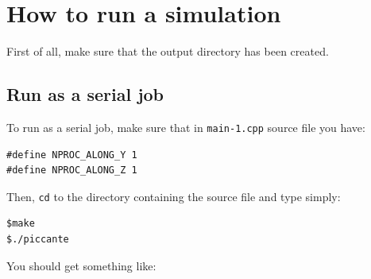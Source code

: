 \documentclass[11pt,a4paper]{report}
\begin{document}
\chapter{How to run a simulation}\label{chapter_run}
First of all, make sure that the output directory has been created.
\section{Run as a serial job}
To run as a serial job, make sure that in \verb+main-1.cpp+ source file you have:
\begin{lstlisting}
#define NPROC_ALONG_Y 1
#define NPROC_ALONG_Z 1
\end{lstlisting}
Then, \verb+cd+ to the directory containing the source file and type simply:
\begin{verbatim}
$make
$./piccante
\end{verbatim}
You should get something like:
\end{document}
